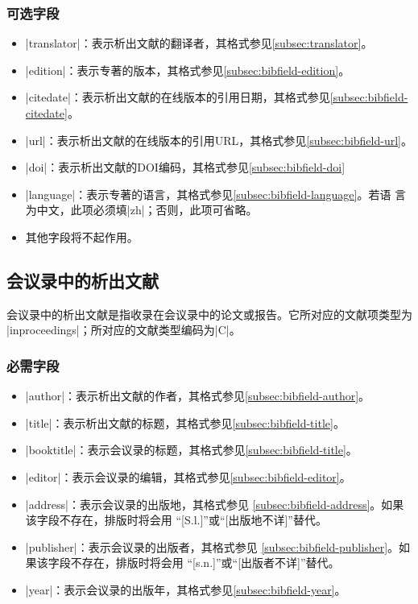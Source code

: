 \subsubsection{可选字段}

\begin{itemize}
\item |translator|：表示析出文献的翻译者，其格式参见\ref{subsec:translator}。
\item |edition|：表示专著的版本，其格式参见\ref{subsec:bibfield-edition}。
\item |citedate|：表示析出文献的在线版本的引用日期，其格式参见\ref{subsec:bibfield-citedate}。
\item |url|：表示析出文献的在线版本的引用URL，其格式参见\ref{subsec:bibfield-url}。
\item |doi|：表示析出文献的DOI编码，其格式参见\ref{subsec:bibfield-doi}
\item |language|：表示专著的语言，其格式参见\ref{subsec:bibfield-language}。若语
  言为中文，此项必须填|zh|；否则，此项可省略。
\item 其他字段将不起作用。
\end{itemize}


\subsection{会议录中的析出文献}\label{subsec:bibtype-inproceedings}

会议录中的析出文献是指收录在会议录中的论文或报告。它所对应的{\BibTeX}文献项类型为
|inproceedings|；所对应的文献类型编码为|C|\cite{gbt3469-1983}。

\subsubsection{必需字段}

\begin{itemize}
\item |author|：表示析出文献的作者，其格式参见\ref{subsec:bibfield-author}。
\item |title|：表示析出文献的标题，其格式参见\ref{subsec:bibfield-title}。
\item |booktitle|：表示会议录的标题，其格式参见\ref{subsec:bibfield-title}。
\item |editor|：表示会议录的编辑，其格式参见\ref{subsec:bibfield-editor}。
\item |address|：表示会议录的出版地，其格式参见
  \ref{subsec:bibfield-address}。如果该字段不存在，{\BibTeX}排版时将会用
  ``[S.l.]''或``[出版地不详]''替代。
\item |publisher|：表示会议录的出版者，其格式参见
  \ref{subsec:bibfield-publisher}。如果该字段不存在，{\BibTeX}排版时将会用
  ``[s.n.]''或``[出版者不详]''替代。
\item |year|：表示会议录的出版年，其格式参见\ref{subsec:bibfield-year}。
\end{itemize}


